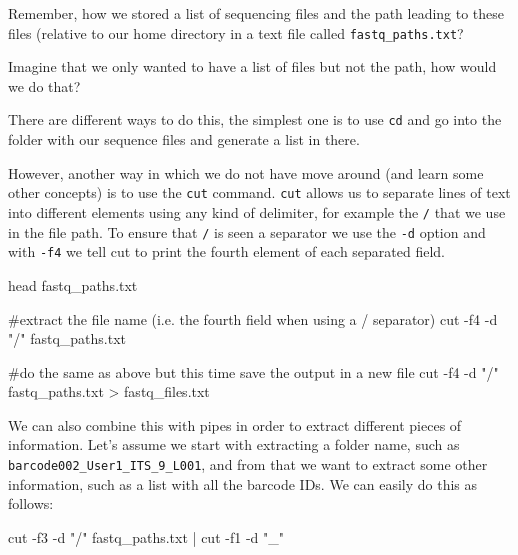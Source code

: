 \documentclass[
  letterpaper,
  DIV=11,
  numbers=noendperiod]{scrreprt}
\newenvironment{Shaded}{}{}
\newcommand{\AttributeTok}[1]{\textcolor[rgb]{0.84,0.23,0.29}{#1}}
\newcommand{\CommentTok}[1]{\textcolor[rgb]{0.42,0.45,0.49}{#1}}
\newcommand{\FunctionTok}[1]{\textcolor[rgb]{0.44,0.26,0.76}{#1}}
\newcommand{\KeywordTok}[1]{\textcolor[rgb]{0.84,0.23,0.29}{#1}}
\newcommand{\NormalTok}[1]{\textcolor[rgb]{0.14,0.16,0.18}{#1}}
\newcommand{\OperatorTok}[1]{\textcolor[rgb]{0.14,0.16,0.18}{#1}}
\newcommand{\StringTok}[1]{\textcolor[rgb]{0.01,0.18,0.38}{#1}}
\begin{document}
Remember, how we stored a list of sequencing files and the path leading
to these files (relative to our home directory in a text file called
\texttt{fastq\_paths.txt}?

Imagine that we only wanted to have a list of files but not the path,
how would we do that?

There are different ways to do this, the simplest one is to use
\texttt{cd} and go into the folder with our sequence files and generate
a list in there.

However, another way in which we do not have move around (and learn some
other concepts) is to use the \texttt{cut} command. \texttt{cut} allows
us to separate lines of text into different elements using any kind of
delimiter, for example the \texttt{/} that we use in the file path. To
ensure that \texttt{/} is seen a separator we use the \texttt{-d} option
and with \texttt{-f4} we tell cut to print the fourth element of each
separated field.

\begin{Shaded}
\begin{Highlighting}[]
\FunctionTok{head}\NormalTok{ fastq\_paths.txt}

\CommentTok{\#extract the file name (i.e. the fourth field when using a / separator)}
\FunctionTok{cut} \AttributeTok{{-}f4} \AttributeTok{{-}d} \StringTok{"/"}\NormalTok{ fastq\_paths.txt}

\CommentTok{\#do the same as above but this time save the output in a new file}
\FunctionTok{cut} \AttributeTok{{-}f4} \AttributeTok{{-}d} \StringTok{"/"}\NormalTok{ fastq\_paths.txt }\OperatorTok{\textgreater{}}\NormalTok{ fastq\_files.txt}
\end{Highlighting}
\end{Shaded}

We can also combine this with pipes in order to extract different pieces
of information. Let's assume we start with extracting a folder name,
such as \texttt{barcode002\_User1\_ITS\_9\_L001}, and from that we want
to extract some other information, such as a list with all the barcode
IDs. We can easily do this as follows:

\begin{Shaded}
\begin{Highlighting}[]
\FunctionTok{cut} \AttributeTok{{-}f3} \AttributeTok{{-}d} \StringTok{"/"}\NormalTok{ fastq\_paths.txt }\KeywordTok{|} \FunctionTok{cut} \AttributeTok{{-}f1} \AttributeTok{{-}d} \StringTok{"\_"}
\end{Highlighting}
\end{Shaded}
\end{document}
